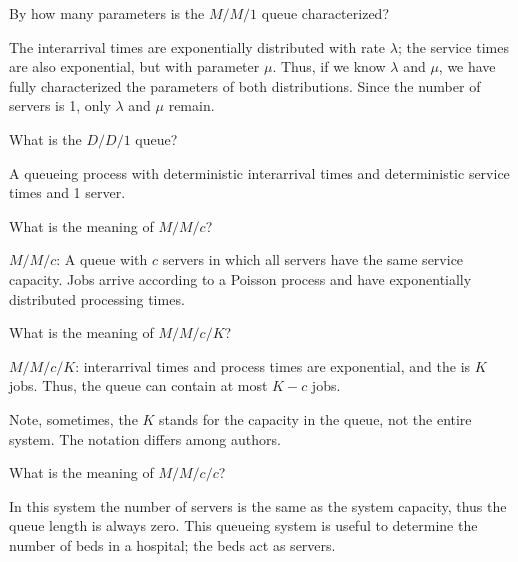 \begin{exercise}
  By how many parameters is the $M/M/1$ queue characterized?
  \begin{solution}
    The interarrival times are exponentially distributed with rate $\lambda$; the service times are also exponential, but with parameter $\mu$. Thus, if we know $\lambda$ and $\mu$, we have fully characterized the parameters of both distributions. Since the number of servers is 1, only $\lambda$ and $\mu$ remain.
  \end{solution}
\end{exercise}

\begin{exercise}
What is the $D/D/1$ queue?  
\begin{solution}
  A queueing process with deterministic interarrival times and deterministic service times and 1 server.
\end{solution}
\end{exercise}

\begin{exercise}
  What is the meaning of $M/M/c$?
  \begin{solution}
$M/M/c$: A  queue with $c$ servers in which
  all servers have the same service capacity. Jobs arrive according to a
  Poisson process and have exponentially distributed processing times.
  \end{solution}
\end{exercise}

\begin{exercise}
  What is the meaning of $M/M/c/K$?
  \begin{solution}
\item $M/M/c/K$: interarrival times and process times are exponential,
  and the  is $K$ jobs. Thus, the queue can
  contain at most $K-c$ jobs. 

Note, sometimes, the $K$ stands for
    the capacity in the queue, not the entire system. The notation differs among
    authors.
  \end{solution}
\end{exercise}


\begin{exercise}
  What is the meaning of $M/M/c/c$?
  \begin{solution}
 In this system the number of servers is the same as
  the system capacity, thus the queue length is always zero. This
  queueing system is useful to determine the number of beds
  in a hospital; the beds act as servers.
  \end{solution}
\end{exercise}

